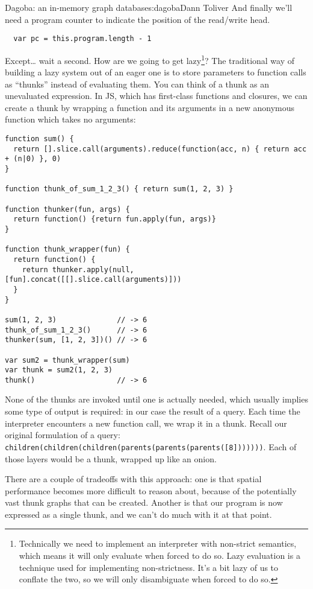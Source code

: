 \begin{aosachapter}{Dagoba: an in-memory graph database}{s:dagoba}{Dann Toliver}
And finally we'll need a program counter to indicate the position of the
read/write head.

\begin{verbatim}
  var pc = this.program.length - 1
\end{verbatim}

Except\ldots{} wait a second. How are we going to get lazy\footnote{Technically
  we need to implement an interpreter with non-strict semantics, which
  means it will only evaluate when forced to do so. Lazy evaluation is a
  technique used for implementing non-strictness. It's a bit lazy of us
  to conflate the two, so we will only disambiguate when forced to do
  so.}? The traditional way of building a lazy system out of an eager
one is to store parameters to function calls as ``thunks'' instead of
evaluating them. You can think of a thunk as an unevaluated expression.
In JS, which has first-class functions and closures, we can create a
thunk by wrapping a function and its arguments in a new anonymous
function which takes no arguments:

\begin{verbatim}
function sum() {
  return [].slice.call(arguments).reduce(function(acc, n) { return acc + (n|0) }, 0)
}

function thunk_of_sum_1_2_3() { return sum(1, 2, 3) }

function thunker(fun, args) {
  return function() {return fun.apply(fun, args)}
}

function thunk_wrapper(fun) {
  return function() {
    return thunker.apply(null, [fun].concat([[].slice.call(arguments)]))
  }
}

sum(1, 2, 3)              // -> 6
thunk_of_sum_1_2_3()      // -> 6
thunker(sum, [1, 2, 3])() // -> 6

var sum2 = thunk_wrapper(sum)
var thunk = sum2(1, 2, 3)
thunk()                   // -> 6
\end{verbatim}

None of the thunks are invoked until one is actually needed, which
usually implies some type of output is required: in our case the result
of a query. Each time the interpreter encounters a new function call, we
wrap it in a thunk. Recall our original formulation of a query:
\texttt{children(children(children(parents(parents(parents({[}8{]}))))))}.
Each of those layers would be a thunk, wrapped up like an onion.

There are a couple of tradeoffs with this approach: one is that spatial
performance becomes more difficult to reason about, because of the
potentially vast thunk graphs that can be created. Another is that our
program is now expressed as a single thunk, and we can't do much with it
at that point.


\end{aosachapter}
